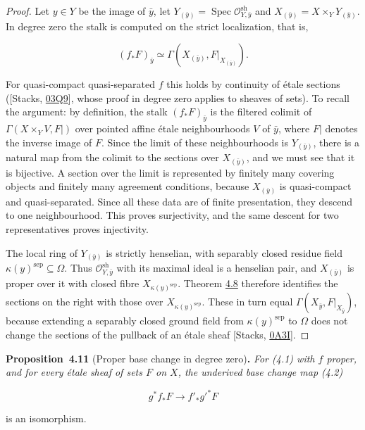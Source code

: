 \documentclass[11pt]{article}
\newenvironment{bpstatement}[2]{\par\addvspace{0.6\baselineskip}\noindent\textbf{#1}#2\textbf{.}\enspace\ignorespaces}
  {\par\addvspace{0.4\baselineskip}}
\newenvironment{bpstatementit}[2]{\begin{bpstatement}{#1}{#2}\itshape\ignorespaces}{\end{bpstatement}}
\begin{document}
\begin{proof}[{Proof}]\label{bp313}%
Let \(y\in Y\) be the image of \(\bar y\), let \(Y_{(\bar y)}=\operatorname{Spec}\mathcal O^{\mathrm{sh}}_{Y,\bar y}\) and \(X_{(\bar y)}=X\times_YY_{(\bar y)}\). In degree zero the stalk is computed on the strict localization, that is,

\[
(f_*F)_{\bar y}\simeq\Gamma(X_{(\bar y)},F|_{X_{(\bar y)}}).
\]

For quasi-compact quasi-separated \(f\) this holds by continuity of étale sections ([Stacks, \href{https://stacks.math.columbia.edu/tag/03Q9}{03Q9}], whose proof in degree zero applies to sheaves of sets). To recall the argument: by definition, the stalk \((f_*F)_{\bar y}\) is the filtered colimit of \(\Gamma(X\times_YV,F|)\) over pointed affine étale neighbourhoods \(V\) of \(\bar y\), where \(F|\) denotes the inverse image of \(F\). Since the limit of these neighbourhoods is \(Y_{(\bar y)}\), there is a natural map from the colimit to the sections over \(X_{(\bar y)}\), and we must see that it is bijective. A section over the limit is represented by finitely many covering objects and finitely many agreement conditions, because \(X_{(\bar y)}\) is quasi-compact and quasi-separated. Since all these data are of finite presentation, they descend to one neighbourhood. This proves surjectivity, and the same descent for two representatives proves injectivity.

The local ring of \(Y_{(\bar y)}\) is strictly henselian, with separably closed residue field \(\kappa(y)^{\mathrm{sep}}\subseteq\Omega\). Thus \(\mathcal O^{\mathrm{sh}}_{Y,\bar y}\) with its maximal ideal is a henselian pair, and \(X_{(\bar y)}\) is proper over it with closed fibre \(X_{\kappa(y)^{\mathrm{sep}}}\). Theorem \hyperref[bp308]{4.8} therefore identifies the sections on the right with those over \(X_{\kappa(y)^{\mathrm{sep}}}\). These in turn equal \(\Gamma(X_{\bar y},F|_{X_{\bar y}})\), because extending a separably closed ground field from \(\kappa(y)^{\mathrm{sep}}\) to \(\Omega\) does not change the sections of the pullback of an étale sheaf [Stacks, \href{https://stacks.math.columbia.edu/tag/0A3I}{0A3I}].
\end{proof}

\label{bp314}%
\begin{bpstatementit}{Proposition~4.11}{ (Proper base change in degree zero)}
For (4.1) with \(f\) proper, and for every étale sheaf of sets \(F\) on \(X\), the underived base change map (4.2)

\[
g^*f_*F\longrightarrow f'_*g'^*F
\]

is an isomorphism.
\end{bpstatementit}
\end{document}
